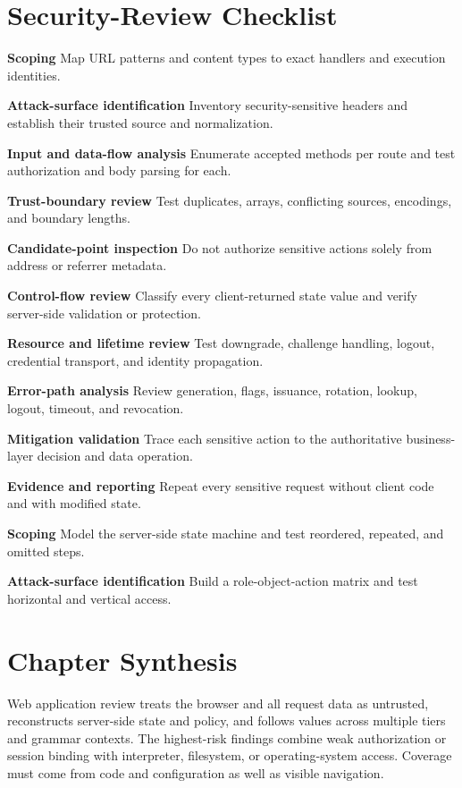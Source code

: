 \documentclass[11pt,letterpaper]{article}
\begin{document}
\section{Security-Review Checklist}
\begin{CornellChecklist}
\item \textbf{Scoping}
Map URL patterns and content types to exact handlers and execution identities.
\item \textbf{Attack-surface identification}
Inventory security-sensitive headers and establish their trusted source and normalization.
\item \textbf{Input and data-flow analysis}
Enumerate accepted methods per route and test authorization and body parsing for each.
\item \textbf{Trust-boundary review}
Test duplicates, arrays, conflicting sources, encodings, and boundary lengths.
\item \textbf{Candidate-point inspection}
Do not authorize sensitive actions solely from address or referrer metadata.
\item \textbf{Control-flow review}
Classify every client-returned state value and verify server-side validation or protection.
\item \textbf{Resource and lifetime review}
Test downgrade, challenge handling, logout, credential transport, and identity propagation.
\item \textbf{Error-path analysis}
Review generation, flags, issuance, rotation, lookup, logout, timeout, and revocation.
\item \textbf{Mitigation validation}
Trace each sensitive action to the authoritative business-layer decision and data operation.
\item \textbf{Evidence and reporting}
Repeat every sensitive request without client code and with modified state.
\item \textbf{Scoping}
Model the server-side state machine and test reordered, repeated, and omitted steps.
\item \textbf{Attack-surface identification}
Build a role-object-action matrix and test horizontal and vertical access.
\end{CornellChecklist}
\section{Chapter Synthesis}
Web application review treats the browser and all request data as untrusted, reconstructs server-side state and policy, and follows values across multiple tiers and grammar contexts. The highest-risk findings combine weak authorization or session binding with interpreter, filesystem, or operating-system access. Coverage must come from code and configuration as well as visible navigation.
\end{document}
